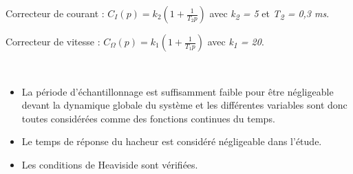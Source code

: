 \documentclass[10pt,fleqn]{article} %
\begin{document}
\begin{multicols}{2}
%
%
%

%
%
%
%
%
%

Correcteur de courant :
\(C_{I}\left( p \right) = k_{2}\left( 1 + \frac{1}{T_{2}p} \right)\)
avec \emph{k\textsubscript{2} = 5} et \emph{T\textsubscript{2} = 0,3 ms}.

Correcteur de vitesse :
\(C_{\Omega}\left( p \right) = k_{1}\left( 1 + \frac{1}{T_{1}p} \right)\)
avec \emph{k\textsubscript{1} = 20}.

\begin{hypo}~\\

\begin{itemize}
\item  La période d'échantillonnage est suffisamment faible pour être
négligeable devant la dynamique globale du système et les différentes
variables sont donc toutes considérées comme des fonctions continues du
temps.
\item Le temps de réponse du hacheur est considéré négligeable dans l'étude.
\item Les conditions de Heaviside sont vérifiées.
\end{itemize}
\end{hypo}


\end{multicols}
\end{document}
